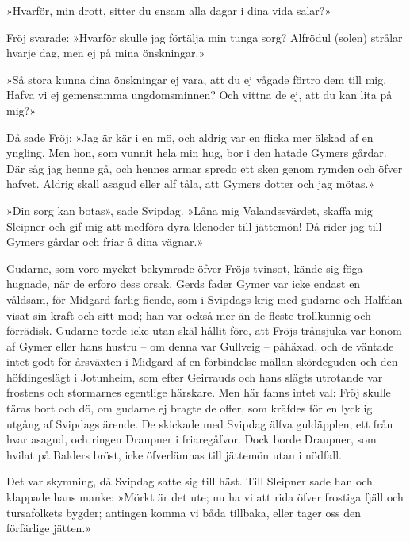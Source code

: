 »Hvarför, min drott, sitter du ensam alla dagar i dina vida salar?»

Fröj svarade: »Hvarför skulle jag förtälja min tunga sorg? Alfrödul
(solen) strålar hvarje dag, men ej på mina önskningar.»

»Så stora kunna dina önskningar ej vara, att du ej vågade förtro dem
till mig. Hafva vi ej gemensamma ungdomsminnen? Och vittna de ej, att du
kan lita på mig?»

Då sade Fröj: »Jag är kär i en mö, och aldrig var en flicka mer älskad
af en yngling. Men hon, som vunnit hela min hug, bor i den hatade Gymers
gårdar. Där såg jag henne gå, och hennes armar spredo ett sken genom
rymden och öfver hafvet. Aldrig skall asagud eller alf tåla, att Gymers
dotter och jag mötas.»

»Din sorg kan botas», sade Svipdag. »Låna mig Valandssvärdet, skaffa mig
Sleipner och gif mig att medföra dyra klenoder till jättemön! Då rider
jag till Gymers gårdar och friar å dina vägnar.»

Gudarne, som voro mycket bekymrade öfver Fröjs tvinsot, kände sig föga
hugnade, när de erforo dess orsak. Gerds fader Gymer var icke endast en
våldsam, för Midgard farlig fiende, som i Svipdags krig med gudarne och
Halfdan visat sin kraft och sitt mod; han var också mer än de fleste
trollkunnig och förrädisk. Gudarne torde icke utan skäl hållit före, att
Fröjs trånsjuka var honom af Gymer eller hans hustru -- om denna var
Gullveig -- påhäxad, och de väntade intet godt för årsväxten i Midgard
af en förbindelse mällan skördeguden och den höfdingeslägt i Jotunheim,
som
\protect\hypertarget{lb1625905.xhtmlux5cux23start133}{}{}\protect\hypertarget{lb1625905.xhtmlux5cux23start133-a}{}{}\protect\hypertarget{lb1625905.xhtmlux5cux23start133-b}{}{}\protect\hypertarget{lb1625905.xhtmlux5cux23start133-c}{}{}\protect\hypertarget{lb1625905.xhtmlux5cux23start133-d}{}{}
efter Geirrauds och hans slägts utrotande var frostens och stormarnes
egentlige härskare. Men här fanns intet val: Fröj skulle täras bort och
dö, om gudarne ej bragte de offer, som kräfdes för en lycklig utgång af
Svipdags ärende. De skickade med Svipdag älfva guldäpplen, ett från hvar
asagud, och ringen Draupner i friaregåfvor. Dock borde Draupner, som
hvilat på Balders bröst, icke öfverlämnas till jättemön utan i nödfall.

Det var skymning, då Svipdag satte sig till häst. Till Sleipner sade han
och klappade hans manke: »Mörkt är det ute; nu ha vi att rida öfver
frostiga fjäll och tursafolkets bygder; antingen komma vi båda tillbaka,
eller tager oss den förfärlige jätten.»

